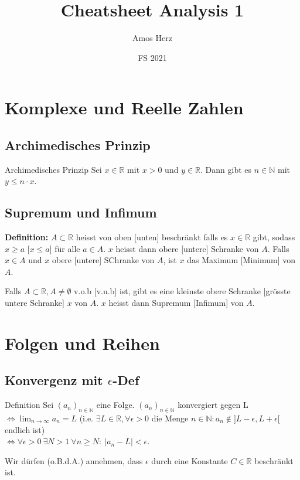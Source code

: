 \documentclass[a4paper,8pt]{extarticle}
\title{\vspace{-1cm}Cheatsheet Analysis 1\vspace{-0.75cm}}
\author{Amos Herz\vspace{-0.5cm}}
\date{FS 2021}
\newenvironment{definition}{
   \noindent \textbf{Definition:  }}{}
\def\R{\mathbb{R}}
\def\N{\mathbb{N}}
\begin{document}
\section{Komplexe und Reelle Zahlen}
\subsection{Archimedisches Prinzip}
\begin{mainbox}{Archimedisches Prinzip}
  Sei $x \in \R$ mit $x > 0$ und $y \in \R$. Dann gibt es $n \in \N$ mit $y \leq n \cdot x$.
\end{mainbox}

\subsection{Supremum und Infimum}
\begin{definition}
  $A \subset \R$ heisst von oben [unten] beschränkt falls es $x \in \R$ gibt, sodass $x \geq a$ [$x \leq a$] für alle $a \in A$. $x$ heisst dann obere [untere] Schranke von $A$. Falls $x\in A$ und $x$ obere [untere] SChranke von $A$, ist $x$ das Maximum [Minimum] von $A$.
\end{definition}
\begin{mainbox}
  Falls $A \subset \R, A \neq \emptyset$ v.o.b [v.u.b] ist, gibt es eine kleinste obere Schranke [grösste untere Schranke] $x$ von $A$. $x$ heisst dann Supremum [Infimum] von $A$.
\end{mainbox}

\section{Folgen und Reihen}
\subsection{Konvergenz mit $\epsilon$-Def}
\begin{mainbox}{Definition}
  Sei $(a_n)_{n\in \mathbb{N}}$ eine Folge. $(a_n)_{n\in \mathbb{N}}$ konvergiert gegen L \\ $\iff \lim_{n \to \infty} a_n = L $ (i.e. $\exists L \in \R, \forall \epsilon > 0$ die Menge ${n \in \N: a_n \notin ]L - \epsilon, L + \epsilon[}$ endlich ist)\\ $\iff \forall \epsilon > 0 \ \exists N > 1 \ \forall n \ge N : \ | a_n - L | < \epsilon$.
\end{mainbox}
Wir dürfen (o.B.d.A.) annehmen, dass $\epsilon$ durch eine Konstante $C \in \R$ beschränkt ist.
\end{document}
